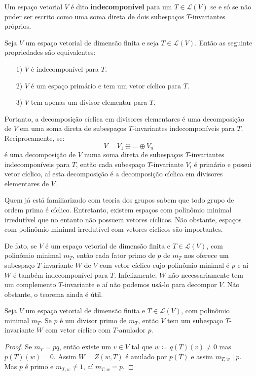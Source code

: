 \documentclass[11pt,twoside,a4paper]{book}
\begin{document}
\begin{definicao}
Um espaço vetorial $V$ é dito \textbf{indecomponível} para um $T\in\mathcal{L}(V)$ se e só se não puder ser escrito como uma soma direta de dois subespaços $T$-invariantes próprios.
\end{definicao}

\begin{teorema}
Seja $V$ um espaço vetorial de dimensão finita e seja $T\in\mathcal{L}(V)$. Então as seguinte propriedades são equivalentes:
\begin{itemize}
\item[1)] $V$ é indecomponível para $T$.
\item[2)] $V$ é um espaço primário e tem um vetor cíclico para $T$.
\item[3)] $V$ tem apenas um divisor elementar para $T$.
\end{itemize}
\end{teorema}

\noindent
Portanto, a decomposição cíclica em divisores elementares é uma decomposição de $V$ em uma soma direta de subespaços $T$-invariantes indecomponíveis para $T$. Reciprocamente, se:
\[
V=V_1\oplus\dots\oplus V_n
\]
é uma decomposição de $V$ numa soma direta de subespaços $T$-invariantes indecomponíveis para $T$, então cada subespaço $T$-invariante $V_i$ é primário e possui vetor cíclico, aí esta decomposição é a decomposição cíclica em divisores elementares de $V$.

\medskip
\noindent
Quem já está familiarizado com teoria dos grupos sabem que todo grupo de ordem prima é cíclico. Entretanto, existem espaços com polinômio minimal irredutível que no entanto não possuem vetores cíclicos. Não obstante, espaços com polinômio minimal irredutível com vetores cíclicos são importantes.

\medskip
\noindent
De fato, se $V$ é um espaço vetorial de dimensão finita e $T\in\mathcal{L}(V)$, com polinômio minimal $m_T$, então cada fator primo de $p$ de $m_T$ nos oferece um subespaço $T$-invariante $W$ de $V$ com vetor cíclico cujo polinômio minimal é $p$ e aí $W$ é também indecomponível para $T$.
Infelizmente, $W$ não necessariamente tem um complemento $T$-invariante e aí não podemos usá-lo
para decompor $V$. Não obstante, o teorema ainda é útil.

\begin{teorema}
Seja $V$ um espaço vetorial de dimensão finita e $T\in\mathcal{L}(V)$, com polinômio minimal $m_T$. Se $p$ é um divisor primo de $m_T$, então $V$ tem um subespaço $T$-invariante $W$ com vetor cíclico com $T$-anulador $p$.
\end{teorema}
\begin{proof}
Se $m_T=pq$, então existe um $v\in V$ tal que $w\coloneqq q(T)(v)\neq 0$ mas $p(T)(w)=0$.
Assim $W=Z(w,T)$ é anulado por $p(T)$ e assim $m_{T,w}\mid p$. Mas $p$ é primo e
$m_{T,w}\neq 1$, aí $m_{T,w}=p$.
\end{proof}
\end{document}
